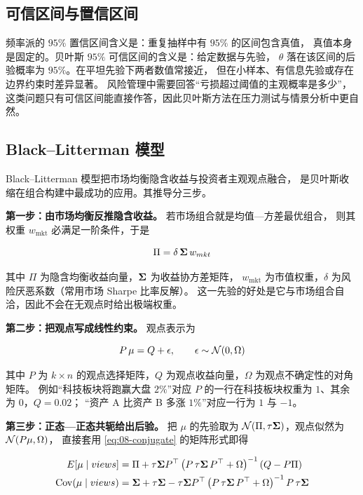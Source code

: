 \subsection{可信区间与置信区间}

频率派的 $95\%$ 置信区间含义是：重复抽样中有 $95\%$ 的区间包含真值，
真值本身是固定的。贝叶斯 $95\%$ 可信区间的含义是：给定数据与先验，
$\theta$ 落在该区间的后验概率为 $95\%$。在平坦先验下两者数值常接近，
但在小样本、有信息先验或存在边界约束时差异显著。
风险管理中需要回答“亏损超过阈值的主观概率是多少”，
这类问题只有可信区间能直接作答，因此贝叶斯方法在压力测试与情景分析中更自然。

\subsection{Black--Litterman 模型}

Black--Litterman 模型把市场均衡隐含收益与投资者主观观点融合，
是贝叶斯收缩在组合构建中最成功的应用。其推导分三步。

\textbf{第一步：由市场均衡反推隐含收益。} 若市场组合就是均值—方差最优组合，
则其权重 $w_{\text{mkt}}$ 必满足一阶条件，于是

\begin{equation}
  \Pi = \delta\,\bm{\Sigma}\, w_{mkt}
  \label{eq:08-blprior}
\end{equation}

其中 $\Pi$ 为隐含均衡收益向量，$\bm{\Sigma}$ 为收益协方差矩阵，
$w_{\text{mkt}}$ 为市值权重，$\delta$ 为风险厌恶系数（常用市场 Sharpe 比率反解）。
这一先验的好处是它与市场组合自洽，因此不会在无观点时给出极端权重。

\textbf{第二步：把观点写成线性约束。} 观点表示为

\begin{equation}
  P\,\mu = Q + \epsilon, \qquad \epsilon \sim \mathcal{N}(0,\Omega)
  \label{eq:08-blviews}
\end{equation}

其中 $P$ 为 $k\times n$ 的观点选择矩阵，$Q$ 为观点收益向量，$\Omega$ 为观点不确定性的对角矩阵。
例如“科技板块将跑赢大盘 $2\%$”对应 $P$ 的一行在科技板块权重为 $1$、其余为 $0$，$Q = 0.02$；
“资产 A 比资产 B 多涨 $1\%$”对应一行为 $1$ 与 $-1$。

\textbf{第三步：正态—正态共轭给出后验。} 把 $\mu$ 的先验取为
$\mathcal{N}(\Pi,\tau\bm{\Sigma})$，观点似然为 $\mathcal{N}(P\mu,\Omega)$，
直接套用 \cref{eq:08-conjugate} 的矩阵形式即得

\begin{align}
  E[\mu \mid views] &= \Pi + \tau\bm{\Sigma} P^{\top}
    \left(P\,\tau\bm{\Sigma}\,P^{\top} + \Omega\right)^{-1}\left(Q - P\Pi\right)
    \label{eq:08-blpost} \\
  \operatorname{Cov}(\mu \mid views) &= \bm{\Sigma} + \tau\bm{\Sigma} -
    \tau\bm{\Sigma} P^{\top}\left(P\,\tau\bm{\Sigma}\,P^{\top} + \Omega\right)^{-1} P\,\tau\bm{\Sigma}
    \label{eq:08-blcov}
\end{align}

